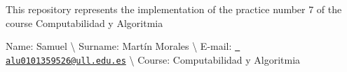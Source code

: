 This repository represents the implementation of the practice number 7 of the course {\ttfamily Computabilidad y Algoritmia}

Name\+: Samuel \textbackslash{} Surname\+: Martín Morales \textbackslash{} E-\/mail\+: \href{mailto:alu0101359526@ull.edu.es}{\texttt{ alu0101359526@ull.\+edu.\+es}} \textbackslash{} Course\+: Computabilidad y Algoritmia 